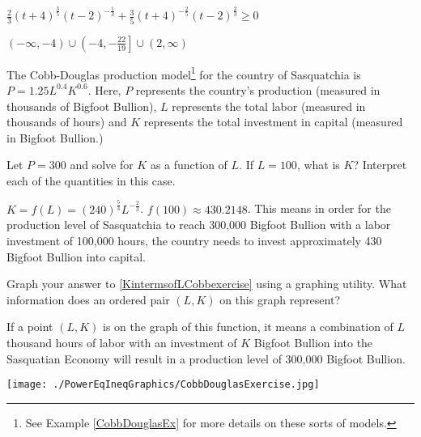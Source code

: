 \documentclass{ximera}
\begin{document}
\begin{question}
$\frac{2}{3}(t + 4)^{\frac{3}{5}}(t - 2)^{-\frac{1}{3}} + \frac{3}{5}(t + 4)^{-\frac{2}{5}}(t - 2)^{\frac{2}{3}} \geq 0$ 

\begin{solution}
$(-\infty, -4) \cup \left(-4, -\frac{22}{19}\right] \cup (2, \infty)$

\end{solution}

\end{question}

\begin{question}
The Cobb-Douglas production model\footnote{See Example \ref{CobbDouglasEx} for more details on these sorts of models.} for the country of Sasquatchia is $P = 1.25L^{0.4}K^{0.6}$.  Here, $P$ represents the country's production (measured in thousands of Bigfoot  Bullion), $L$ represents the total labor (measured in thousands of hours) and $K$ represents the total investment in capital (measured in Bigfoot Bullion.)

\begin{solution}
\end{solution}

\end{question}

\begin{question}
Let $P = 300$ and solve for $K$ as a function of  $L$.  If $L = 100$, what is $K$?  Interpret each of the quantities in this case.
\begin{solution}
$K=f(L) = (240)^{ \frac{5}{3}} L^{- \frac{2}{3}}$.  $f(100)  \approx 430.2148$.  This means in order for the production level of Sasquatchia to reach 300,000 Bigfoot Bullion with a labor investment of 100,000 hours, the country needs to invest approximately 430 Bigfoot Bullion into capital.
\end{solution}

\end{question}

\begin{question}
Graph your answer to \ref{KintermsofLCobbexercise} using a graphing utility.  What information does an ordered pair $(L, K)$ on this graph represent?
\begin{solution}
If a point $(L,K)$ is on the graph of this function, it means a combination of $L$ thousand hours of labor with an investment of $K$ Bigfoot Bullion into the Sasquatian Economy will result in a production level of 300,000 Bigfoot Bullion.

\centerline{\texttt{[image: ./PowerEqIneqGraphics/CobbDouglasExercise.jpg]}}
\end{solution}

\end{question}
\end{document}
